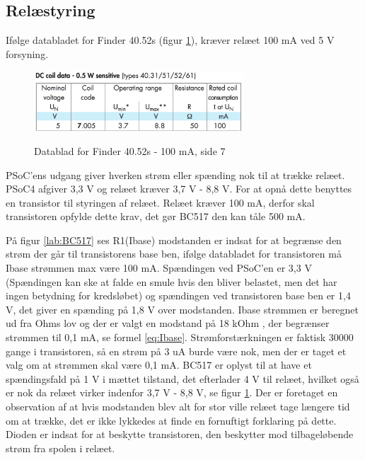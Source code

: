 \subsection{Relæstyring}

Ifølge databladet for Finder 40.52s (figur \ref{lab:finder4052s}), kræver relæet 100 mA ved 5 V forsyning.

\begin{figure}[H] \centering
{\includegraphics[width=0.7\textwidth]{filer/design/Billeder/finder4052s}}
\caption{Datablad for Finder 40.52s - 100 mA, side 7}
\label{lab:finder4052s}
\raggedright
\end{figure} 

PSoC'ens udgang giver hverken strøm eller spænding nok til at trække relæet. PSoC4 afgiver 3,3 V og relæet kræver 3,7 V - 8,8 V. For at opnå dette benyttes en transistor til styringen af relæet. Relæet kræver 100 mA, derfor skal transistoren opfylde dette krav, det gør BC517 den kan tåle 500 mA. \newline

På figur \ref{lab:BC517} ses R1(Ibase) modstanden er indsat for at begrænse den strøm der går til transistorens base ben, ifølge databladet for transistoren må Ibase strømmen max være 100 mA. Spændingen ved PSoC'en er 3,3 V (Spændingen kan ske at falde en smule hvis den bliver belastet, men det har ingen betydning for kredsløbet) og spændingen ved transistoren base ben er 1,4 V, det giver en spænding på 1,8 V over modstanden. Ibase strømmen er beregnet ud fra Ohms lov og der er valgt en modstand på 18 kOhm , der begrænser strømmen til 0,1 mA, se formel \ref{eq:Ibase}.
\newline \newline
Strømforstærkningen er faktisk 30000 gange i transistoren, så en strøm på 3 uA burde være nok, men der er taget et valg om at strømmen skal være 0,1 mA. BC517 er oplyst til at have et spændingsfald på 1 V i mættet tilstand, det efterlader 4 V til relæet, hvilket også er nok da relæet virker indenfor 3,7 V - 8,8 V, se figur \ref{lab:finder4052s}. Der er foretaget en observation af at hvis modstanden blev alt for stor ville relæet tage længere tid om at trække, det er ikke lykkedes at finde en fornuftigt forklaring på dette. Dioden er indsat for at beskytte transistoren, den beskytter mod tilbageløbende strøm fra spolen i relæet.

